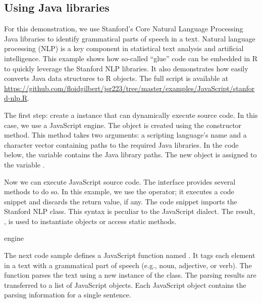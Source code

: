 \subsection{Using Java libraries}

For this demonstration, we use Stanford's Core Natural Language Processing Java libraries \citep{stanfordcorenlp} to identify grammatical parts of speech in a text. Natural language processing (NLP) is a key component in statistical text analysis and artificial intelligence. This example shows how so-called ``glue'' code can be embedded in R to quickly leverage the Stanford NLP libraries. It also demonstrates how easily  converts Java data structures to R objects. The full script is available at \url{https://github.com/floidgilbert/jsr223/tree/master/examples/JavaScript/stanford-nlp.R}.

The first step: create a   instance that can dynamically execute source code. In this case, we use a JavaScript engine. The object is created using the  constructor method. This method takes two arguments: a scripting language's name and a character vector containing paths to the required Java libraries. In the code below, the  variable contains the Java library paths. The new  object is assigned to the variable .

Now we can execute JavaScript source code. The  interface provides several methods to do so. In this example, we use the  operator; it executes a code snippet and discards the return value, if any. The code snippet imports the Stanford NLP  class. This syntax is peculiar to the JavaScript dialect. The result, , is used to instantiate objects or access static methods.

\begin{example}
engine %
\end{example}
The next code sample defines a JavaScript function named . It tags each element in a text with a grammatical part of speech (e.g., noun, adjective, or verb). The function parses the text using a new instance of the  class. The parsing results are transferred to a list of JavaScript objects. Each JavaScript object contains the parsing information for a single sentence.

